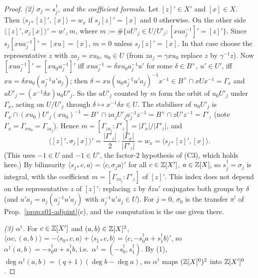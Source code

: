 \begin{proof}
\emph{(2) $\sigma_j=s_j^\dagger$, and the coefficient formula.} Let $[z]'\in X'$ and $[x]\in X$. Then
$\langle s_{j*}[z]',[x]\rangle=w_x$ if $s_j[z]'=[x]$ and $0$ otherwise. On the other side $\langle[z]',\sigma_j[x]\rangle'=w'_z\,m$, where
$m:=\#\{uU'_j\in U/U'_j:[xua_j^{-1}]'=[z]'\}$. Since $s_j[xua_j^{-1}]'=[xu]=[x]$, $m=0$ unless $s_j[z]'=[x]$. In that case choose the representative $z$ with
$za_j=xu_0$, $u_0\in U$ (from $za_j=\gamma xu_0$ replace $z$ by $\gamma^{-1}z$). Now $[xua_j^{-1}]'=[xu_0a_j^{-1}]'$ iff $xua_j^{-1}=\delta xu_0a_j^{-1}u'$ for
some $\delta\in B^\times$, $u'\in U'$, iff $xu=\delta xu_0(a_j^{-1}u'a_j)$; then $\delta=xu(u_0a_j^{-1}u'a_j)^{-1}x^{-1}\in B^\times\cap xUx^{-1}=\Gamma_x$ and
$uU'_j=(x^{-1}\delta x)u_0U'_j$. So the $uU'_j$ counted by $m$ form the orbit of $u_0U'_j$ under $\Gamma_x$, acting on $U/U'_j$ through
$\delta\mapsto x^{-1}\delta x\in U$. The stabiliser of $u_0U'_j$ is
$\Gamma_x\cap(xu_0)U'_j(xu_0)^{-1}=B^\times\cap za_jU'_ja_j^{-1}z^{-1}=B^\times\cap zU'z^{-1}=\Gamma'_z$ (note $\Gamma_x=\Gamma_{xu_0}=\Gamma_{za_j}$). Hence
$m=[\Gamma_{za_j}:\Gamma'_z]=|\Gamma_x|/|\Gamma'_z|$, and
\[\langle[z]',\sigma_j[x]\rangle'=\frac{|\Gamma'_z|}2\cdot\frac{|\Gamma_x|}{|\Gamma'_z|}=w_x=\langle s_{j*}[z]',[x]\rangle .\]
(This uses $-1\in U$ and $-1\in U'$, the factor-$2$ hypothesis of (C3), which holds here.) By bilinearity $\langle s_{j*}c,a\rangle=\langle c,\sigma_ja\rangle'$ for
all $c\in\mathbb{Z}[X']$, $a\in\mathbb{Z}[X]$, so $s_j^\dagger=\sigma_j$ is integral, with the coefficient $m=[\Gamma_{za_j}:\Gamma'_z]$ of $[z]'$. This index does not depend on
the representative $z$ of $[z]'$: replacing $z$ by $\delta zu'$ conjugates both groups by $\delta$ (and $u'a_j=a_j(a_j^{-1}u'a_j)$ with $a_j^{-1}u'a_j\in U$). For
$j=0$, $\sigma_0$ is the transfer $\pi^!$ of Prop.~\ref{prop:s01-adjoint}(c), and the computation is the one given there.

\emph{(3) $\alpha^\dagger$.} For $c\in\mathbb{Z}[X']$ and $(a,b)\in\mathbb{Z}[X]^2$,
$\langle\alpha c,(a,b)\rangle=-\langle s_{0*}c,a\rangle+\langle s_{1*}c,b\rangle=\langle c,-s_0^\dagger a+s_1^\dagger b\rangle'$, so
$\alpha^\dagger(a,b)=-s_0^\dagger a+s_1^\dagger b$, i.e.\ $\alpha^\dagger=(-s_0^\dagger,s_1^\dagger)$. By (1), $\deg\alpha^\dagger(a,b)=(q+1)(\deg b-\deg a)$, so
$\alpha^\dagger$ maps $(\mathbb{Z}[X]^0)^2$ into $\mathbb{Z}[X']^0$.


\end{proof}
